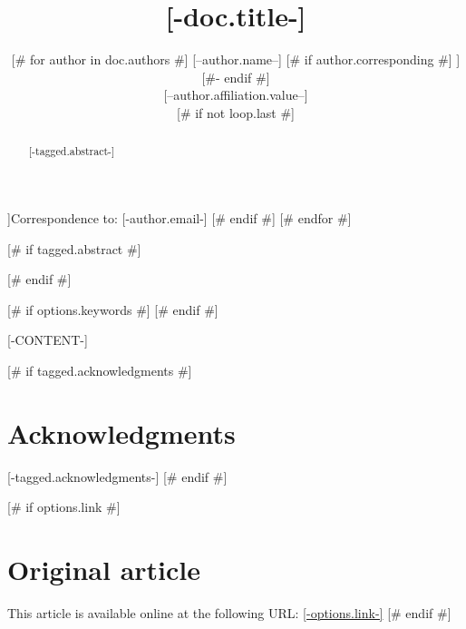 \documentclass{article}
\title{[-doc.title-]}
\date{\displaydate{articleDate}}
[# else #]
\date{}
[# endif #]
\author{[# for author in doc.authors #]
[--author.name--]
[# if author.corresponding #]
\footnotemark[[-author.corresponding.index-]]
[#- endif #]\\
[# if author.affiliation #][--author.affiliation.value--]\\[# endif #]
[# if not loop.last #]
\AND
[# endif #]
[# endfor #]
}
\begin{document}
\footnotetext[[-author.corresponding.index-]]{Correspondence to: [-author.email-]}
[# endif #]
[# endfor #]

[# if tagged.abstract #]
\begin{abstract}
[-tagged.abstract-]
\end{abstract}
[# endif #]

[# if options.keywords #]
[# endif #]

[-CONTENT-]

[# if tagged.acknowledgments #]
\section*{Acknowledgments}
[-tagged.acknowledgments-]
[# endif #]

[# if options.link #]
\section*{Original article}
\footnotesize
This article is available online at the following URL: \href{[-options.link-]}{[-options.link-]}
\normalsize
[# endif #]



\end{document}

